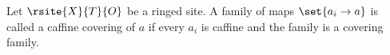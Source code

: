 \begin{definition}
Let $\rsite{X}{T}{O}$ be a ringed site.
A family of maps $\set{a_i \rightarrow a}$
is called a caffine covering of $a$ if every $a_i$ is caffine
and the family is a covering family.
\end{definition}